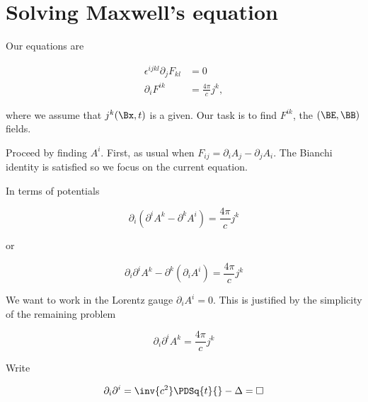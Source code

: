 %
%
\section{Solving Maxwell's equation}

Our equations are

\begin{equation}\label{eqn:relativisticElectrodynamicsL17b:210}
\begin{aligned}
\epsilon^{i j k l} \partial_j F_{k l} &= 0 \\
\partial_i F^{i k} &= \frac{4 \pi}{c} j^k,
\end{aligned}
\end{equation}

where we assume that \(j^k(\Bx, t)\) is a given.  Our task is to find \(F^{i k}\), the \((\BE, \BB)\) fields.

Proceed by finding \(A^i\).  First, as usual when \(F_{i j} = \partial_i A_j - \partial_j A_i\).  The Bianchi identity is satisfied so we focus on the current equation.

In terms of potentials

\begin{equation}\label{eqn:relativisticElectrodynamicsL17b:230}
\partial_i (\partial^i A^k - \partial^k A^i) = \frac{ 4 \pi}{c} j^k
\end{equation}

or

\begin{equation}\label{eqn:relativisticElectrodynamicsL17b:250}
\partial_i \partial^i A^k - \partial^k (\partial_i A^i) = \frac{ 4 \pi}{c} j^k
\end{equation}

We want to work in the Lorentz gauge \(\partial_i A^i = 0\).  This is justified by the simplicity of the remaining problem

\begin{equation}\label{eqn:relativisticElectrodynamicsL17b:270}
\partial_i \partial^i A^k = \frac{4 \pi}{c} j^k
\end{equation}

Write

\begin{equation}\label{eqn:relativisticElectrodynamicsL17b:290}
\partial_i \partial^i = \inv{c^2} \PDSq{t}{} - \Delta = \square
\end{equation}

